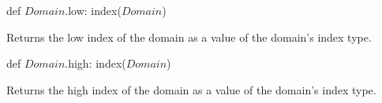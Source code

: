 
\begin{protohead}
def $Domain$.low: index($Domain$)
\end{protohead}
\begin{protobody}
Returns the low index of the domain as a value of the domain's index
type.
\end{protobody}

\begin{protohead}
def $Domain$.high: index($Domain$)
\end{protohead}
\begin{protobody}
Returns the high index of the domain as a value of the domain's index
type.
\end{protobody}


